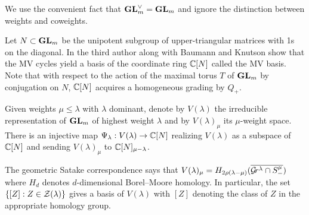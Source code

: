 \documentclass[draft]{article} %
\begin{document}
We use the convenient fact that ${\mathbf{GL}}_m^\vee = {\mathbf{GL}}_m$ and ignore the distinction between weights and coweights.

% 


Let $N\subset{\mathbf{GL}}_m$ be the unipotent subgroup of upper-triangular matrices with 1s on the diagonal. In \cite{baumann2019mirkovic} the third author along with Baumann and Knutson show that the MV cycles yield a basis of the coordinate ring $\mathbb C[N]$ called the MV basis. Note that with respect to the action of the maximal torus $T$ of ${\mathbf{GL}}_m$ by conjugation on $N$, $\mathbb C[N]$ acquires a homogeneous grading by $Q_+$. 
% 
% 

Given weights $\mu\le\lambda$ with $\lambda$ dominant, denote by $V(\lambda)$ the irreducible representation of ${\mathbf{GL}}_m$ of highest weight $\lambda$ and by $V(\lambda)_\mu$ its $\mu$-weight space. 
There is an injective map $ \Psi_\lambda: V(\lambda) \to \mathbb C[N]$ realizing $V(\lambda)$ as a subspace of $\mathbb C[N]$ and sending $ V(\lambda)_\mu$ to $\mathbb C[N]_{\mu - \lambda}$. 

The geometric Satake correspondence says that 
$V(\lambda)_\mu = H_{2\rho(\lambda-\mu)}(\overline{\mathcal{G}\!r^\lambda\cap S^\mu_-})$ where $H_d$ denotes $d$-dimensional Borel--Moore homology. In particular, the set $\{[Z] : Z\in\mathcal Z(\lambda)\}$ gives a basis of $V(\lambda)$ with $[Z]$ denoting the class of $Z$ in the appropriate homology group. 

% 
% 
\end{document}
